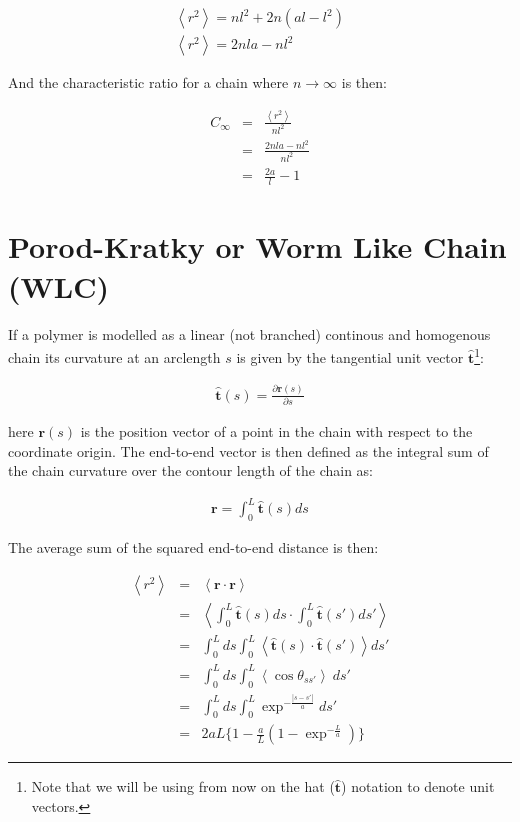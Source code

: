 \begin{gather}
\left<r^{2}\right> = nl^{2} + 2n(al-l^{2})\\
\left<r^{2}\right> = 2nla - nl^{2}
\end{gather}  

And the characteristic ratio for a chain where $n \to \infty$ is then:

\begin{eqnarray}
C_{\infty} & =  & \frac{\left<r^{2}\right>}{ nl^{2}}\\
          & =  & \frac{2nla - nl^{2}}{nl^{2}}\\
          & =  & \frac{2a}{l} - 1
\end{eqnarray}  

\section{Porod-Kratky or Worm Like Chain (WLC)}
If a polymer is modelled as a linear (not branched) continous and
homogenous chain its curvature at an arclength $s$ is given by the
tangential unit vector $\hat{\mathbf{t}}$\footnote{Note that we will
be using from now on the hat ($\hat{\mathbf{t}}$) notation to denote
unit vectors.}:

\begin{gather}
\hat{\mathbf{t}}(s)=\frac{\partial{\textbf{r}(s)}}{\partial{s}}
\end{gather}

here $\textbf{r}(s)$ is the position vector of a point in the chain
with respect to the coordinate origin.
The end-to-end vector is then defined as the integral sum of the chain
curvature over the contour length of the chain as:

\begin{gather}
\textbf{r}=\int_{0}^{L}\hat{\textbf{t}}(s)ds
\end{gather}

The average sum of the squared end-to-end distance is then:

\begin{eqnarray}
\label{eq:wlc}
\left<r^2\right> & = & \left<\textbf{r} \cdot \textbf{r}\right> \nonumber \\
               & = & \left<\int_{0}^{L}\hat{\textbf{t}}(s)ds \cdot \int_{0}^{L}\hat{\textbf{t}}(s')ds' \right>\nonumber \\
               & = & \int_{0}^{L} ds \int_{0}^{L} \left<\hat{\textbf{t}}(s) \cdot \hat{\textbf{t}}(s')\right>ds' \nonumber \\
               & = & \int_{0}^{L} ds \int_{0}^{L} \left<\cos{\theta}_{ss'}\right>~ ds' \nonumber \\
               & = & \int_{0}^{L} ds \int_{0}^{L} \exp^{-\frac{|s-s'|}{a}} ds' \nonumber \\
               & = & 2aL \{ 1 - \frac{a}{L}(1-\exp^{-\frac{L}{a}})\}
\end{eqnarray}

